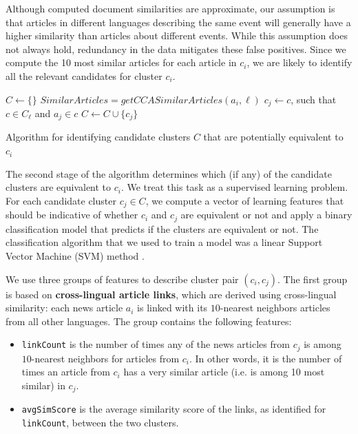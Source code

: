 \documentclass[twoside,11pt]{article}
\begin{document}
Although computed document similarities are approximate, our  assumption is that articles in different languages describing the same event will generally have a higher similarity than articles about different events. While this assumption does not always hold, redundancy in the data mitigates these false positives. Since we compute the 10 most similar articles for each article in $c_i$, we are likely to identify all the relevant candidates for cluster $c_i$.

\begin{algorithm}[t!]
$C \leftarrow \{\}$\;
 {
     {
        $SimilarArticles = getCCASimilarArticles(a_i, \ell)$\;
         {
            $c_j \leftarrow c$, such that $c \in C_\ell$ and $a_j \in c$\;
            $C \leftarrow C \cup \{ c_j \}$\;
        }
    }
}
\caption{Algorithm for identifying candidate clusters $C$ that are potentially equivalent to $c_i$}
\label{cluster_merge_algo1}
\end{algorithm}

The second stage of the algorithm determines which (if any) of the candidate clusters are equivalent to $c_i$. We treat this task as a supervised learning problem. For each candidate cluster $c_j \in C$, we compute a vector of learning features that should be indicative of whether $c_i$ and $c_j$ are equivalent or not and apply a binary classification model that predicts if the clusters are equivalent or not. The classification algorithm that we used to train a model was a linear Support Vector Machine (SVM) method .

We use three groups of features to describe cluster pair $(c_i, c_j)$. The first group is based on {\bf cross-lingual article links}, which are derived using cross-lingual similarity: each news article $a_i$ is linked with its $10$-nearest neighbors articles from all other languages. The group contains the following features:

\begin{itemize}
\item \texttt{linkCount} is the number of times any of the news articles from $c_j$ is among $10$-nearest neighbors for articles from $c_i$. In other words, it is the number of times an article from $c_i$ has a very similar article (i.e. is among 10 most similar) in $c_j$.
\item \texttt{avgSimScore} is the average similarity score of the links, as identified for \texttt{linkCount}, between the two clusters.
\end{itemize}
\end{document}
